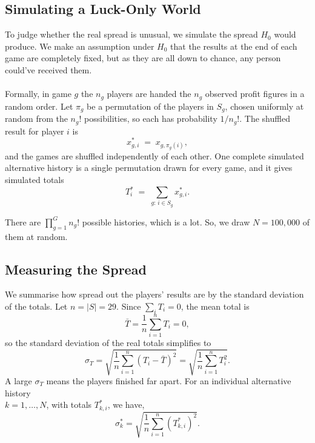 \documentclass[11pt,a4paper]{article}
\begin{document}
\subsection{Simulating a Luck-Only World}

To judge whether the real spread is unusual, we simulate the spread $H_0$ would produce. We make an assumption under $H_0$ that the results at the end of each game are completely fixed, but as they are all down to chance, any person could've received them.\\\\
Formally, in game $g$ the $n_g$ players are handed the $n_g$ observed profit figures in a random order. Let $\pi_g$ be a permutation of the players in $S_g$, chosen uniformly at random from the $n_g!$ possibilities, so each has
probability $1/n_g!$. The shuffled result for player $i$ is
\begin{equation}
  x^{*}_{g,i} \;=\; x_{g,\pi_g(i)},
\end{equation}
and the games are shuffled independently of each other. One complete simulated alternative history is a single permutation drawn for every game, and it gives simulated totals
\begin{equation}
  T^{*}_i \;=\; \sum_{g:\, i\in S_g} x^{*}_{g,i}.
\end{equation}

There are $\prod_{g=1}^{G} n_g!$ possible histories, which is a lot. So, we draw $N = 100,000$ of them at random.

\subsection{Measuring the Spread}

We summarise how spread out the players' results are by the standard deviation of the totals. Let $n=|S|=29$. Since $\sum_i T_i = 0$, the mean total
is
\begin{equation}
  \bar{T} = \frac{1}{n}\sum_{i=1}^{n} T_i = 0,
\end{equation}
so the standard deviation of the real totals simplifies to
\begin{equation}
  \sigma_T
  = \sqrt{\frac{1}{n}\sum_{i=1}^{n}\left(T_i-\bar{T}\right)^2}
  = \sqrt{\frac{1}{n}\sum_{i=1}^{n} T_i^{2}}.
\end{equation}
A large $\sigma_T$ means the players finished far apart. For an individual alternative history \\$k=1,\dots,N$, with totals $T^{*}_{k,i}$, we have,
\begin{equation}
  \sigma^{*}_k
  = \sqrt{\frac{1}{n}\sum_{i=1}^{n}\left(T^{*}_{k,i}\right)^{2}}.
\end{equation}
\end{document}
